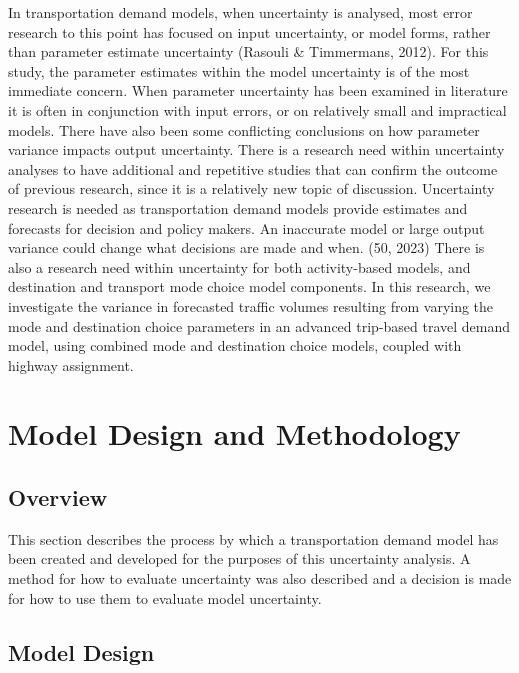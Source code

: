 \documentclass[fancy, masters, twoside]{byuthesis}
\begin{document}
In transportation demand models, when uncertainty is analysed, most error research to this point has focused on input uncertainty, or model forms, rather than parameter estimate uncertainty (Rasouli \& Timmermans, 2012). For this study, the parameter estimates within the model uncertainty is of the most immediate concern. When parameter uncertainty has been examined in literature it is often in conjunction with input errors, or on relatively small and impractical models. There have also been some conflicting conclusions on how parameter variance impacts output uncertainty. There is a research need within uncertainty analyses to have additional and repetitive studies that can confirm the outcome of previous research, since it is a relatively new topic of discussion. Uncertainty research is needed as transportation demand models provide estimates and forecasts for decision and policy makers. An inaccurate model or large output variance could change what decisions are made and when. (50, 2023) There is also a research need within uncertainty for both activity-based models, and destination and transport mode choice model components. In this research, we investigate the variance in forecasted traffic volumes resulting from varying the mode and destination choice parameters in an advanced trip-based travel demand model, using combined mode and destination choice models, coupled with highway assignment.

\hypertarget{model-design-and-methodology}{%
\chapter{Model Design and Methodology}\label{model-design-and-methodology}}

\hypertarget{overview}{%
\section{Overview}\label{overview}}

This section describes the process by which a transportation demand model has been created and developed for the purposes of this uncertainty analysis. A method for how to evaluate uncertainty was also described and a decision is made for how to use them to evaluate model uncertainty.

\hypertarget{model-design}{%
\section{Model Design}\label{model-design}}
\end{document}
